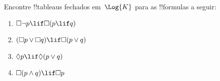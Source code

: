 \documentclass[../../../include/open-logic-section]{subfiles}
\begin{document}
\begin{prob}
  Encontre !!{tableau}s fechados em~$\Log{K}$ para as !!{formula}s a seguir:
  \begin{enumerate}
    \item $\Box \lnot p \lif \Box(p \lif q)$
    \item $(\Box p \lor \Box q) \lif \Box(p \lor q)$
    \item $\Diamond p \lif \Diamond(p \lor q)$
    \item $\Box(p \land q) \lif \Box p$
  \end{enumerate}
\end{prob}
\end{document}
